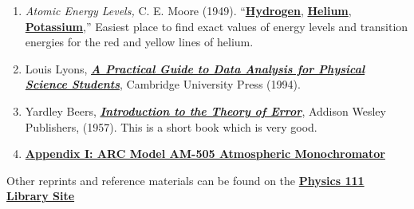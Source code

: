 \documentclass{../lab}
\begin{document}
\begin{enumerate}
    \item \emph{Atomic Energy Levels,} C. E. Moore (1949). ``\href{http://physics111.lib.berkeley.edu/Physics111/Reprints/ATM/Atomic\%20Energy\%20Levels/OCR\%20Hydrogen.pdf}{\textbf{Hydrogen}}, \href{http://physics111.lib.berkeley.edu/Physics111/Reprints/ATM/Atomic\%20Energy\%20Levels/OCR\%20Helium.pdf}{\textbf{Helium}}, \href{http://physics111.lib.berkeley.edu/Physics111/Reprints/ATM/Atomic\%20Energy\%20Levels/OCR\%20Potassium.pdf}{\textbf{Potassium}},'' Easiest place to find exact values of energy levels and transition energies for the red and yellow lines of helium.
    
    \item Louis Lyons, \emph{\href{http://physics111.lib.berkeley.edu/Physics111/Reprints/Data\%20Analysis\%20Book\%20PDF/Error\%20Analysis\%20Book-Louis\%20Lyons.pdf}{\textbf{A Practical Guide to Data Analysis for Physical Science Students}}}, Cambridge University Press (1994).
    
    \item Yardley Beers, \emph{\href{http://physics111.lib.berkeley.edu/Physics111/Reprints/Data\%20Analysis\%20Book\%20PDF/Error\%20Analysis\%20-\%20Beers\_Theory\%20of\%20Error.pdf}{\textbf{Introduction to the Theory of Error}}}, Addison Wesley Publishers, (1957). This is a short book which is very good.
    
    \item \href{http://experimentationlab.berkeley.edu/ATMAppendix1}{\textbf{Appendix I: ARC Model AM-505 Atmospheric Monochromator}}
\end{enumerate}

\noindent Other reprints and reference materials can be found on the \href{\LabReprints}{\textbf{Physics 111 Library Site}}
\end{document}
